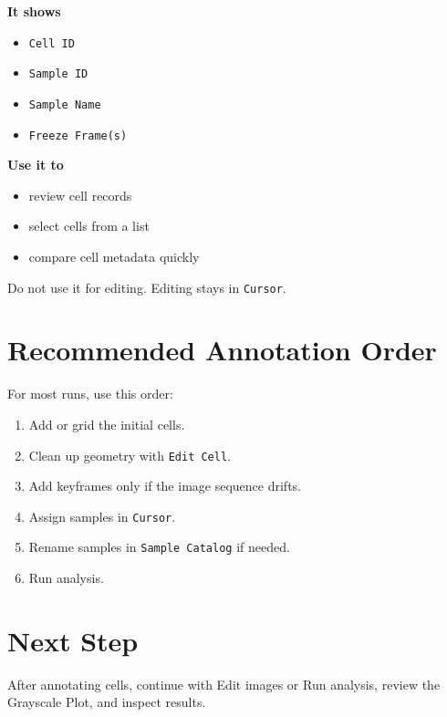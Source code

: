 \documentclass[
  9pt,
  letterpaper,
  oneside,
  open=any,
  DIV=15,
  parskip=half-,
  headings=big,
  numbers=noenddot
]{scrbook}
\newcommand{\manuallead}[1]{%
  \vspace{0.15em}%
  {\sffamily\bfseries\color{ManualBlue}#1}\par\nobreak\vspace{0.05em}%
}
\begin{document}
\manuallead{It shows}

\begin{itemize}[leftmargin=*,itemsep=0.35em,topsep=0.4em]
\item \texttt{Cell ID}
\item \texttt{Sample ID}
\item \texttt{Sample Name}
\item \texttt{Freeze Frame(s)}
\end{itemize}

\manuallead{Use it to}

\begin{itemize}[leftmargin=*,itemsep=0.35em,topsep=0.4em]
\item review cell records
\item select cells from a list
\item compare cell metadata quickly
\end{itemize}

Do not use it for editing. Editing stays in \texttt{Cursor}.


\section{Recommended Annotation Order}

For most runs, use this order:


\begin{enumerate}[leftmargin=*,itemsep=0.35em,topsep=0.4em]
\item Add or grid the initial cells.
\item Clean up geometry with \texttt{Edit Cell}.
\item Add keyframes only if the image sequence drifts.
\item Assign samples in \texttt{Cursor}.
\item Rename samples in \texttt{Sample Catalog} if needed.
\item Run analysis.
\end{enumerate}

\section{Next Step}

After annotating cells, continue with Edit images or Run analysis, review the Grayscale Plot, and inspect results.
\end{document}
